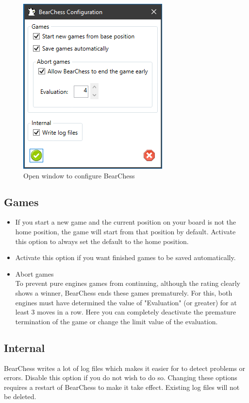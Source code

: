 \documentclass[11pt,a4paper]{article}
\begin{document}
\begin{figure}[H]
	\centering
	\includegraphics[scale=1.0]{ConfigureBearChess.png}
	\caption{Open window to configure BearChess}
	\label{fig:ConfigureBearChess}
\end{figure}

\subsection{Games}
\begin{itemize}
	\item If you start a new game and the current position on your board is not the home position, the game will start from that position by default. Activate this option to always set the default to the home position.
	\item Activate this option if you want finished games to be saved automatically.
	\item Abort games\\To prevent pure engines games from continuing, although the rating clearly shows a winner, BearChess ends these games prematurely. For this, both engines must have determined the value of "Evaluation" (or greater) for at least 3 moves in a row. Here you can completely deactivate the premature termination of the game or change the limit value of the evaluation.
\end{itemize}

\subsection{Internal}
BearChess writes a lot of log files which makes it easier for to detect problems or errors.
Disable this option if you do not wish to do so. Changing these options requires a restart of BearChess to make it take effect. Existing log files will not be deleted.
\end{document}

